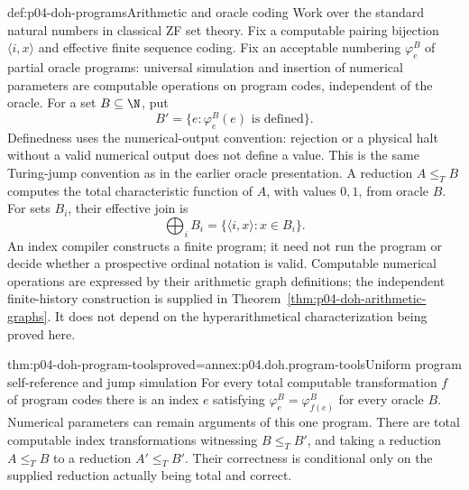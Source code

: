 \begin{hbconvention}{def:p04-doh-programs}{Arithmetic and oracle coding}
Work over the standard natural numbers in classical ZF set theory. Fix a
computable pairing bijection \(\langle i,x\rangle\) and effective finite
sequence coding. Fix an acceptable numbering \(\varphi_e^B\) of partial
oracle programs: universal simulation and insertion of numerical parameters
are computable operations on program codes, independent of the oracle.
For a set \(B\subseteq\N\), put
\[
 B'=\{e:\varphi_e^B(e)\text{ is defined}\}.
\]
Definedness uses the numerical-output convention: rejection or a physical
halt without a valid numerical output does not define a value. This is
the same Turing-jump convention as in the earlier oracle presentation.
A reduction \(A\leq_T B\) computes the total characteristic function of
\(A\), with values \(0,1\), from oracle \(B\).
For sets \(B_i\), their effective join is
\[
 \bigoplus_i B_i=\{\langle i,x\rangle:x\in B_i\}.
\]
An index compiler constructs a finite program; it need not run the program
or decide whether a prospective ordinal notation is valid. Computable
numerical operations are expressed by their arithmetic graph definitions;
the independent finite-history construction is supplied in
Theorem~\ref{thm:p04-doh-arithmetic-graphs}. It does not depend on the
hyperarithmetical characterization being proved here.
\end{hbconvention}

\begin{hblemma}{thm:p04-doh-program-tools}{proved=annex:p04.doh.program-tools}{Uniform program self-reference and jump simulation}
For every total computable transformation \(f\) of program codes there is
an index \(e\) satisfying \(\varphi_e^B=\varphi_{f(e)}^B\) for every oracle
\(B\). Numerical parameters can remain arguments of this one program.
There are total computable index transformations witnessing
\(B\leq_T B'\), and taking a reduction \(A\leq_T B\) to a reduction
\(A'\leq_T B'\). Their correctness is conditional only on the supplied
reduction actually being total and correct.
\end{hblemma}

